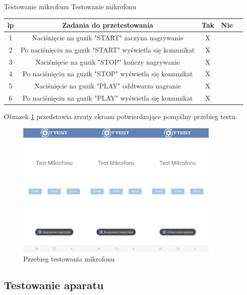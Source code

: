 \begin{tabela}
	{Testowanie mikrofonu}	%
	{Testowanie mikrofonu}	%
	{
		\begin{tabular}{|c|c|c|c|c|} \hline
			\textbf{lp} & \textbf{Zadania do przetestowania} & \textbf{Tak} & \textbf{Nie} \\ \hline
			1 & Naciśnięcie na guzik "START" zaczyna nagrywanie & X & ~ \\ \hline
			2 & Po naciśnięciu na guzik "START" wyświetla się komunikat & X & ~ \\ \hline
			3 & Naciśnięcie na guzik "STOP" kończy nagrywanie & X & ~ \\ \hline
			4 & Po naciśnięciu na guzik "STOP" wyświetla się komunikat & X & ~ \\ \hline
			5 & Naciśnięcie na guzik "PLAY" oddtwarza nagranie & X & ~ \\ \hline
			6 &  Po naciśnięciu na guzik "PLAY" wyświetla się komunikat & X & ~ \\ \hline
	\end{tabular}	}
	\label{tab:tablica_mikrofon}
\end{tabela}

Obrazek \ref{rys:mikrofon} przedstawia zrzuty ekranu potwierdzające pomyślny przebieg testu.

\begin{figure}[!hbt]
	\begin{center}
		\includegraphics[angle=360, width=0.90\textwidth]{rys/punkt5/mikrofon.jpg}
		\caption{Przebieg testowania mikrofonu}
		\label{rys:mikrofon}
	\end{center}
\end{figure} 

\newpage


\subsection{Testowanie aparatu}

